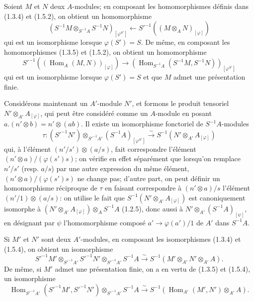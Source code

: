 \begin{env}[1.5.3]
\label{0.1.5.3-fr}
Soient $M$ et $N$ deux $A$-modules; en composant les homomorphismes définis dans (1.3.4) et (1.5.2), on obtient un homomorphisme
\[
  (S^{-1}M\otimes_{S^{-1}A}S^{-1}N)_{[\varphi^{S'}]}
  \longleftarrow
  S'^{-1}((M\otimes_A N)_{[\varphi]})
\]
qui est un isomorphisme lorsque $\varphi(S')=S$.
De même, en composant les homomorphismes (1.3.5) et (1.5.2), on obtient un homomorphisme
\[
  S'^{-1}((\operatorname{Hom}_A(M,N))_{[\varphi]})
  \longrightarrow
  (\operatorname{Hom}_{S^{-1}A}(S^{-1}M,S^{-1}N))_{[\varphi^{S'}]}
\]
qui est un isomorphisme lorsque $\varphi(S')=S$ et que $M$ admet une présentation finie.
\end{env}

\begin{env}[1.5.4]
\label{0.1.5.4-fr}
Considérons maintenant un $A'$-module $N'$, et formons le produit tensoriel $N'\otimes_{A'}A_{[\varphi]}$, qui peut être considéré comme un $A$-module en posant
$a.(n'\otimes b)=n'\otimes(ab)$.
Il existe un isomorphisme fonctoriel de $S^{-1}A$-modules
\[
  \tau:(S'^{-1}N')\otimes_{S'^{-1}A'}(S^{-1}A)_{[\varphi^{S'}]}
  \xrightarrow{\sim}
  S^{-1}(N'\otimes_{A'}A_{[\varphi]})
\]
qui, à l'élément $(n'/s')\otimes(a/s)$, fait correspondre l'élément
$(n'\otimes a)/(\varphi(s')s)$; on vérifie en effet séparément que lorsqu'on
remplace $n'/s'$ (resp. $a/s$) par une autre expression du même élément,
$(n'\otimes a)/(\varphi(s')s)$ ne change pas; d'autre part, on peut définir un
homomorphisme réciproque de $\tau$ en faisant correspondre à $(n'\otimes a)/s$
l'élément $(n'/1)\otimes(a/s)$: on utilise le fait que
$S^{-1}(N'\otimes_{A'}A_{[\varphi]})$ est canoniquement isomorphe à
$(N'\otimes_{A'}A_{[\varphi]})\otimes_A S^{-1}A$ (1.2.5), donc aussi à
$N'\otimes_{A'}(S^{-1}A)_{[\psi]}$, en désignant par $\psi$ l'homomorphisme
composé $a'\to\varphi(a')/1$ de $A'$ dans $S^{-1}A$.
\end{env}

\begin{env}[1.5.5]
\label{0.1.5.5-fr}
Si $M'$ et $N'$ sont deux $A'$-modules, en composant les isomorphismes (1.3.4)
et (1.5.4), on obtient un isomorphisme
\[
  S'^{-1}M'\otimes_{S'^{-1}A'}S'^{-1}N'
  \otimes_{S'^{-1}A'}S^{-1}A
  \xrightarrow{\sim}
  S^{-1}(M'\otimes_{A'}N'\otimes_{A'}A).
\]
De même, si $M'$ admet une présentation finie, on a en vertu de (1.3.5) et
(1.5.4), un isomorphisme
\[
  \operatorname{Hom}_{S'^{-1}A'}(S'^{-1}M',S'^{-1}N')
  \otimes_{S'^{-1}A'}S^{-1}A
  \xrightarrow{\sim}
  S^{-1}(\operatorname{Hom}_{A'}(M',N')\otimes_{A'}A).
\]
\end{env}

